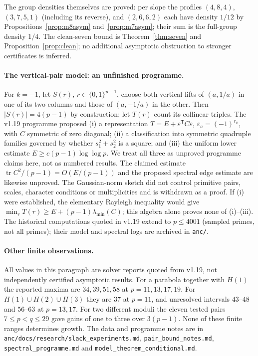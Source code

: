 \documentclass[11pt]{article}
\theoremstyle{remark}
\begin{document}
The group densities themselves are proved: per slope the profiles $(4,8,4)$, $(3,7,5,1)$ (including its reverse), and $(2,6,6,2)$
each have density $1/12$ by Propositions~\ref{prop:m8asym} and~\ref{prop:m7asym}; their sum is the full-group density $1/4$.
The clean-seven bound is Theorem~\ref{thm:seven} and Proposition~\ref{prop:clean}; no additional asymptotic obstruction to stronger certificates is inferred.

\paragraph{The vertical-pair model: an unfinished programme.}
For $k=-1$, let $S(r)$, $r\in\{0,1\}^{p-1}$, choose both vertical lifts of $(a,1/a)$ in one of its two columns
and those of $(a,-1/a)$ in the other.  Then $|S(r)|=4(p-1)$ by construction; let $T(r)$ count its collinear triples.
The v1.19 programme proposed (i) a representation $T=E+\varepsilon^{\mathsf T}C\varepsilon$, $\varepsilon_a=(-1)^{r_a}$,
with $C$ symmetric of zero diagonal; (ii) a classification into symmetric quadruple families governed by whether $s_1^2+s_2^2$ is a square;
and (iii) the uniform lower estimate $E\ge c(p-1)\log\log p$.
We treat all three as unproved programme claims here, not as numbered results.
The claimed estimate $\operatorname{tr}C^2/(p-1)=O(E/(p-1))$ and the proposed spectral edge estimate are likewise unproved.
The Gaussian-norm sketch did not control primitive pairs, scales, character conditions or multiplicities and is withdrawn as a proof.
If (i) were established, the elementary Rayleigh inequality would give
$\min_rT(r)\ge E+(p-1)\lambda_{\min}(C)$; this algebra alone proves none of (i)--(iii).
The historical computations quoted in v1.19 extend to $p\le4001$ (sampled primes, not all primes); their model and spectral logs are archived in \texttt{anc/}.

\paragraph{Other finite observations.}
All values in this paragraph are solver reports quoted from v1.19, not independently certified asymptotic results.
For a parabola together with $H(1)$ the reported maxima are $34,39,51,58$ at $p=11,13,17,19$.
For $H(1)\cup H(2)\cup H(3)$ they are $37$ at $p=11$, and unresolved intervals $43$--$48$ and $56$--$63$ at $p=13,17$.
For two different moduli the eleven tested pairs $7\le p<q\le29$ gave gains of one to three over $3(p-1)$.
None of these finite ranges determines growth.  The data and programme notes are in
\texttt{anc/docs/research/slack\_experiments.md}, \texttt{pair\_bound\_notes.md},
\texttt{spectral\_programme.md} and \texttt{model\_theorem\_conditional.md}.
\end{document}
